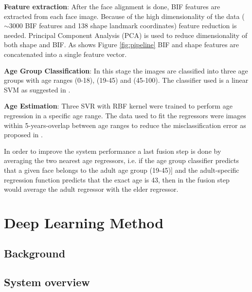 \textbf{Feature extraction}: 
After the face alignment is done, BIF features are extracted from each face image. Because of the high dimensionality of the data ($\sim3000$ BIF features and 138 shape landmark coordinates) feature reduction is needed. Principal Component Analysis (PCA) is used to reduce dimensionality of both shape and BIF. As shows Figure \ref{fig:pipeline} BIF and shape features are concatenated into a single feature vector.

\textbf{Age Group Classification}:
In this stage the images are classified into three age groups with age ranges (0-18), (19-45) and (45-100). The classifier used is a linear SVM as suggested in \cite{4531189}.

\textbf{Age Estimation}:
Three SVR with RBF kernel were trained to perform age regression in a specific age range. The data used to fit the regressors were images within 5-years-overlap between age ranges to reduce the misclassification error as proposed in \cite{han:age}. 

In order to improve the system performance a last fusion step is done by averaging the two nearest age regressors, i.e. if the age group classifier predicts that a given face belongs to the adult age group (19-45)] and the adult-specific regression function predicts that the exact age is 43, then in the fusion step would average the adult regressor with the elder regressor.


\section{Deep Learning Method}
\subsection{Background}
\subsection{System overview}
